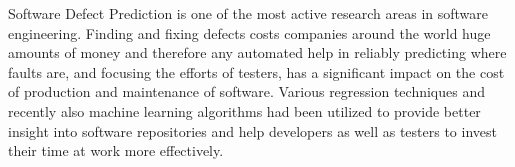 Software Defect Prediction is one of the most active research areas in software engineering. Finding and fixing defects costs companies around the world huge amounts of money and therefore any automated help in reliably predicting where faults are, and focusing the efforts of testers, has a significant impact on the cost of production and maintenance of software. Various regression techniques and recently also machine learning algorithms had been utilized to provide better insight into software repositories and help developers as well as testers to invest their time at work more effectively. 